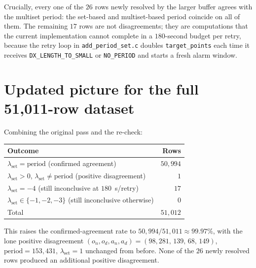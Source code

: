 \documentclass[11pt]{article}
\begin{document}
Crucially, every one of the $26$ rows newly resolved by the larger
buffer agrees with the multiset period: the set-based and multiset-based
period coincide on all of them. The remaining $17$ rows are not
disagreements; they are computations that the current implementation
cannot complete in a $180$-second budget per retry, because the retry
loop in \texttt{add\_period\_set.c} doubles \texttt{target\_points} each
time it receives \texttt{DX\_LENGTH\_TO\_SMALL} or \texttt{NO\_PERIOD}
and starts a fresh alarm window.

\section*{Updated picture for the full 51{,}011-row dataset}

Combining the original pass and the re-check:

\begin{center}
\begin{tabular}{lr}
\toprule
Outcome & Rows \\
\midrule
$\lambda_{\text{set}} = \mathrm{period}$ (confirmed agreement) & $50{,}994$ \\
$\lambda_{\text{set}} > 0$, $\lambda_{\text{set}} \neq \mathrm{period}$ (positive disagreement) & $1$ \\
$\lambda_{\text{set}} = -4$ (still inconclusive at $180$~s/retry) & $17$ \\
$\lambda_{\text{set}} \in \{-1,-2,-3\}$ (still inconclusive otherwise) & $0$ \\
\midrule
Total                                                            & $51{,}012$ \\
\bottomrule
\end{tabular}
\end{center}

This raises the confirmed-agreement rate to
$50{,}994 / 51{,}011 \approx 99.97\%$, with the lone positive
disagreement
$(o_n,o_d,a_n,a_d) = (98{,}281,\,139,\,68,\,149)$,
$\mathrm{period} = 153{,}431$, $\lambda_{\text{set}} = 1$
unchanged from before. None of the $26$ newly resolved rows produced an
additional positive disagreement.
\end{document}
